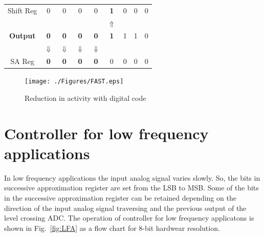 \begin{table}[h]
\begin{center}	
		\begin{tabular}{ c  c  c  c  c  c  c  c  c }
					Shift Reg  	& 0 & 0 & 0 & 0 & \textbf{1} & 0 & 0 & 0 \\
				   				& &  &  &  &$\Uparrow$ & & & \\	
	 		 		\textbf{Output}   & \textbf{0} & \textbf{0} & \textbf{0} & \textbf{0} & \textbf{1} & 1 & 1 & 0 \\
				   				& $\Downarrow$ & $\Downarrow$ &  $\Downarrow$ &  $\Downarrow$ & & & & \\
					SA Reg     	& \textbf{0} & \textbf{0} & \textbf{0} & \textbf{0} & 0 & 0 & 0 & 0 \\
			
		\end{tabular}
	\end{center}
\end{table}

\begin{figure}[H]
	\begin{center}
		\texttt{[image: ./Figures/FAST.eps]}
		\caption{Reduction in activity with digital code}
		\label{fig:MHF}
	\end{center}
\end{figure}



\section{Controller for low frequency applications}

\par
\hspace{1.2cm} In low frequency applications the input analog signal varies slowly. So, the bits in successive approximation register are set from the LSB to MSB. Some of the bits in the successive approximation register can be retained depending on the direction of the input analog signal traversing and the previous output of the level crossing ADC. The operation of controller for low frequency applicatons is shown in Fig.~\ref{fig:LFA} as a flow chart for 8-bit hardwear resolution. \par

